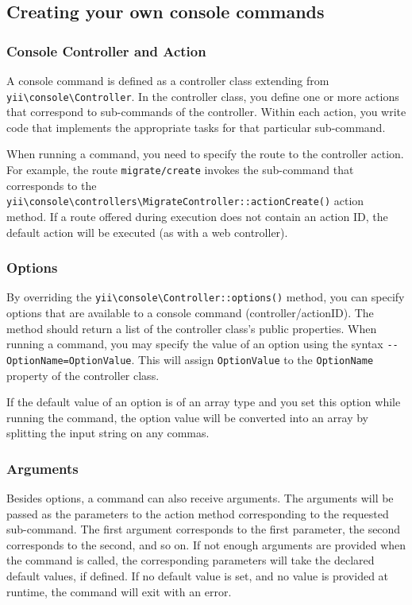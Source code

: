 \subsection{Creating your own console commands \label{tutorial-console.md::create-command}}
\subsubsection{Console Controller and Action}
A console command is defined as a controller class extending from \texttt{yii{\allowbreak{}\textbackslash}console{\allowbreak{}\textbackslash}Controller}. In the controller class,
you define one or more actions that correspond to sub-commands of the controller. Within each action, you write code that implements the appropriate tasks for that particular sub-command.

When running a command, you need to specify the route to the  controller action. For example,
the route \lstinline|migrate/create| invokes the sub-command that corresponds to the
\texttt{yii{\allowbreak{}\textbackslash}console{\allowbreak{}\textbackslash}controllers{\allowbreak{}\textbackslash}MigrateController\allowbreak{}::\allowbreak{}actionCreate()} action method.
If a route offered during execution does not contain an action ID, the default action will be executed (as with a web controller).

\subsubsection{Options}
By overriding the \texttt{yii{\allowbreak{}\textbackslash}console{\allowbreak{}\textbackslash}Controller\allowbreak{}::\allowbreak{}options()} method, you can specify options that are available
to a console command (controller/actionID). The method should return a list of the controller class's public properties.
When running a command, you may specify the value of an option using the syntax \lstinline|--OptionName=OptionValue|.
This will assign \lstinline|OptionValue| to the \lstinline|OptionName| property of the controller class.

If the default value of an option is of an array type and you set this option while running the command,
the option value will be converted into an array by splitting the input string on any commas.

\subsubsection{Arguments}
Besides options, a command can also receive arguments. The arguments will be passed as the parameters to the action
method corresponding to the requested sub-command. The first argument corresponds to the first parameter, the second
corresponds to the second, and so on. If not enough arguments are provided when the command is called, the corresponding parameters
will take the declared default values, if defined. If no default value is set, and no value is provided at runtime, the command will exit with an error.

